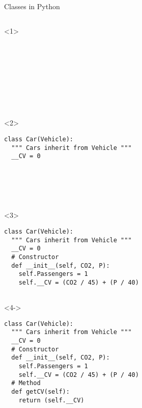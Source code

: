 \begin{frame}[fragile]{Classes in Python}

  \begin{columns}[onlytextwidth]
    \begin{column}{\textwidth}

      \begin{onlyenv}<1>
        \begin{lstlisting}[style=python]









 \end{lstlisting}
      \end{onlyenv}

      \begin{onlyenv}<2>
        \begin{lstlisting}[style=python]
class Car(Vehicle):
  """ Cars inherit from Vehicle """
  __CV = 0






 \end{lstlisting}
      \end{onlyenv}

      \begin{onlyenv}<3>
        \begin{lstlisting}[style=python]
class Car(Vehicle):
  """ Cars inherit from Vehicle """
  __CV = 0
  # Constructor
  def __init__(self, CO2, P):
    self.Passengers = 1
    self.__CV = (CO2 / 45) + (P / 40)


 \end{lstlisting}
      \end{onlyenv}

      \begin{onlyenv}<4->
        \begin{lstlisting}[style=python]
class Car(Vehicle):
  """ Cars inherit from Vehicle """
  __CV = 0
  # Constructor
  def __init__(self, CO2, P):
    self.Passengers = 1
    self.__CV = (CO2 / 45) + (P / 40)
  # Method
  def getCV(self):
    return (self.__CV) \end{lstlisting}
      \end{onlyenv}

    \end{column}
  \end{columns}

\end{frame}

